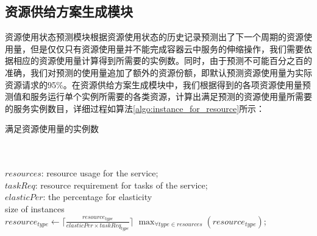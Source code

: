 \subsection{资源供给方案生成模块}\label{sec:provision_active}
资源使用状态预测模块根据资源使用状态的历史记录预测出了下一个周期的资源使用量，但是仅仅只有资源使用量并不能完成容器云中服务的伸缩操作，我们需要依据相应的资源使用量计算得到所需要的实例数。同时，由于预测不可能百分之百的准确，我们对预测的使用量追加了额外的资源份额，即默认预测资源使用量为实际资源请求的95\%。在资源供给方案生成模块中，我们根据得到的各项资源使用量预测值和服务运行单个实例所需要的各类资源，计算出满足预测的资源使用量所需要的服务实例数目，详细过程如算法\ref{algo:instance_for_resource}所示：
\begin{algorithm}[h]
\caption{满足资源使用量的实例数}
\label{algo:instance_for_resource}
\begin{algorithmic}[0]
\\
\Require ~~\
\\
$resources$: resource usage for the service;\\
$taskReq$: resource requirement for tasks of the service;\\
$elasticPer$: the percentage for elasticity
\Ensure ~~\
\\
size of instances \\

        \State $resource_{type} \gets  \lceil \frac{resource_{type}}{{elasticPer} \times {taskReq_{type}}} \rceil$
    \EndFor
    \State \Return $\max_{\forall type \in resources} {(resource_{type})}$;
\EndFunction
\end{algorithmic}
\end{algorithm}

